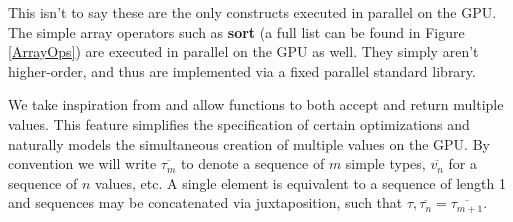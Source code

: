 \documentclass[preprint]{sigplanconf}
\begin{document}
This isn't to say these are the only constructs executed in parallel on the GPU. The simple array operators such as \textbf{sort} (a full list can be found in Figure \ref{ArrayOps}) are executed in parallel on the GPU as well. They simply aren't higher-order, and thus are implemented via a fixed parallel standard library.

We take inspiration from \cite{Bol09} and allow functions to both accept and return multiple values. This feature simplifies the specification of certain optimizations and naturally models the simultaneous creation of multiple values on the GPU. By convention we will write $\overline{\tau_m}$ to denote a sequence of $m$ simple types, $\overline{v_n}$ for a sequence  of $n$ values, etc. A single element is equivalent to a sequence of length 1 and sequences may be concatenated via juxtaposition, such that $\tau, \overline{\tau_n} = \overline{\tau_{m+1}}$.
\end{document}
